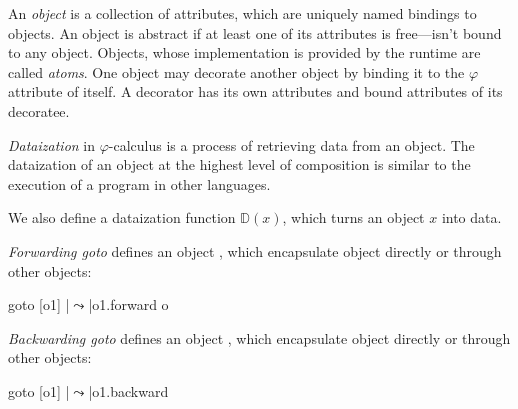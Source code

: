 \begin{eodefinition}
An \emph{object} is a collection of attributes, which are uniquely named bindings to objects.
An object is abstract if at least one of its attributes is free---isn’t bound to any object.
Objects, whose implementation is provided by the runtime are called \emph{atoms}.
One object may decorate another object by binding it to the $\varphi$ attribute of itself.
A decorator has its own attributes and bound attributes of its decoratee.
\end{eodefinition}
\begin{eodefinition}
\emph{Dataization} in $\varphi$-calculus is a process of retrieving data from an object.
The dataization of an object at the highest level of composition is similar to the execution of a program in other languages.

We also define a dataization function $\mathbb{D}(x)$, which turns an object $x$ into data.
\end{eodefinition}
\begin{eodefinition}
\emph{Forwarding goto} defines an object , which encapsulate object  directly or through other objects:
\begin{ffcode}
goto
  [o1]
   |$\leadsto$|o1.forward o
\end{ffcode}
\end{eodefinition}
\begin{eodefinition}
\emph{Backwarding goto} defines an object , which encapsulate object  directly or through other objects:
\begin{ffcode}
goto
  [o1]
   |$\leadsto$|o1.backward
\end{ffcode}
\end{eodefinition}

